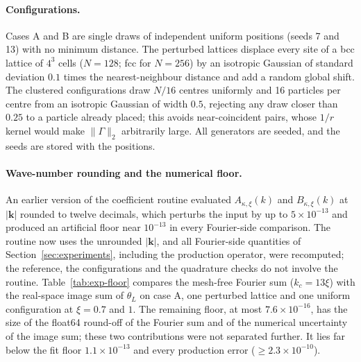 \documentclass[11pt]{article}
\theoremstyle{plain}
\newcommand{\kk}{\bm k}
\DeclareRobustCommand{\_}{\textunderscore\allowbreak}
\begin{document}
\paragraph{Configurations.}
Cases A and B are single draws of independent uniform positions (seeds 7 and
13) with no minimum distance. The perturbed lattices displace every site of a
bcc lattice of $4^3$ cells ($N=128$; fcc for $N=256$) by an isotropic Gaussian
of standard deviation $0.1$ times the nearest-neighbour distance and add a
random global shift. The clustered configurations draw $N/16$ centres
uniformly and 16 particles per centre from an isotropic Gaussian of width
$0.5$, rejecting any draw closer than $0.25$ to a particle already placed; this
avoids near-coincident pairs, whose $1/r$ kernel would make $\|\Gamma\|_2$
arbitrarily large. All generators are seeded, and the seeds are stored with
the positions.

\paragraph{Wave-number rounding and the numerical floor.}
An earlier version of the coefficient routine evaluated
$A_{\kappa,\xi}(k)$ and $B_{\kappa,\xi}(k)$ at $|\kk|$ rounded to twelve
decimals, which perturbs the input by up to $5\times10^{-13}$ and produced an
artificial floor near $10^{-13}$ in every Fourier-side comparison. The
routine now uses the unrounded $|\kk|$, and all Fourier-side quantities of
Section~\ref{sec:experiments}, including the production operator, were
recomputed; the reference, the configurations and the quadrature checks do
not involve the routine. Table~\ref{tab:exp-floor} compares the mesh-free
Fourier sum ($k_c=13\xi$) with the real-space image sum of $\theta_L$ on case
A, one perturbed lattice and one uniform configuration at $\xi=0.7$ and $1$.
The remaining floor, at most $7.6\times10^{-16}$, has the size of the float64
round-off of the Fourier sum and of the numerical uncertainty of the image
sum; these two contributions were not separated further. It lies far below
the fit floor $1.1\times10^{-13}$ and every production error
($\ge2.3\times10^{-10}$).
\end{document}
